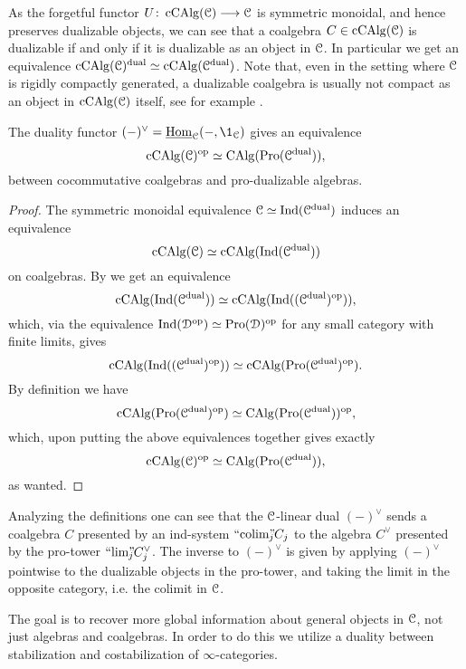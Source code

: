 \begin{remark}
    \label{rm:dualizable-iff-underlying}
    As the forgetful functor $U\colon\operatorname{cCAlg}(\EuScript{C})\longrightarrow\EuScript{C}$ is symmetric monoidal, and hence preserves dualizable objects, we can see that a coalgebra $C\in \operatorname{cCAlg}(\EuScript{C})$ is dualizable if and only if it is dualizable as an object in $\EuScript{C}$. In particular we get an equivalence $\operatorname{cCAlg}(\EuScript{C})^{\mathrm{dual}}\simeq \operatorname{cCAlg}(\EuScript{C}^{\mathrm{dual}})$. Note that, even in the setting where $\EuScript{C}$ is rigidly compactly generated, a dualizable coalgebra is usually not compact as an object in $\operatorname{cCAlg}(\EuScript{C})$ itself, see for example \cite[1.2.15]{lurie_2018_ELL2}. 
\end{remark}

\begin{lemma}
    \label{ch2:lm:sweedler-duality}
    The duality functor $(-)^\vee = \iHom_\C(-,\1_\C)$ gives an equivalence 
    \[\operatorname{cCAlg}(\EuScript{C})^{\mathrm{op}}\simeq \operatorname{CAlg}(\operatorname{Pro}(\EuScript{C}^{\mathrm{dual}})),\]
    between cocommutative coalgebras and pro-dualizable algebras.
\end{lemma}
\begin{proof}
    The symmetric monoidal equivalence $\EuScript{C}\simeq \operatorname{Ind}(\EuScript{C}^{\mathrm{dual}})$ induces an equivalence 
    \[\operatorname{cCAlg}(\EuScript{C}) \simeq \operatorname{cCAlg}(\operatorname{Ind}(\EuScript{C}^{\mathrm{dual}}))\]
    on coalgebras. By \cite[3.2.4]{lurie_2018_ELL1} we get an equivalence 
    \[\operatorname{cCAlg}(\operatorname{Ind}(\EuScript{C}^{\mathrm{dual}}))\simeq \operatorname{cCAlg}(\operatorname{Ind}((\EuScript{C}^{\mathrm{dual}})^{\mathrm{op}})),\]
    which, via the equivalence $\operatorname{Ind}(\EuScript{D}^{\mathrm{op}})\simeq \operatorname{Pro}(\EuScript{D})^{\mathrm{op}}$ for any small category with finite limits, gives 
    \[\operatorname{cCAlg}(\operatorname{Ind}((\EuScript{C}^{\mathrm{dual}})^{\mathrm{op}}))\simeq \operatorname{cCAlg}(\operatorname{Pro}(\EuScript{C}^{\mathrm{dual}})^{\mathrm{op}}).\]
    By definition we have 
    \[\operatorname{cCAlg}(\operatorname{Pro}(\EuScript{C}^{\mathrm{dual}})^{\mathrm{op}})\simeq \operatorname{CAlg}(\operatorname{Pro}(\EuScript{C}^{\mathrm{dual}}))^{\mathrm{op}},\]
    which, upon putting the above equivalences together gives exactly 
    \[\operatorname{cCAlg}(\EuScript{C})^{\mathrm{op}}\simeq \operatorname{CAlg}(\operatorname{Pro}(\EuScript{C}^{\mathrm{dual}})),\]
    as wanted. 
\end{proof}

\begin{remark}
    \label{ch2:rm:coalebra-in-Ind}
    Analyzing the definitions one can see that the $\EuScript{C}$-linear dual $(-)^\vee$ sends a coalgebra $C$ presented by an ind-system $``\!\operatorname{colim}\!"_{\hspace{-5pt} j} C_j$ to the algebra $C^\vee$ presented by the pro-tower $``\!\lim\!"_{\hspace{-5pt} j} C_j^\vee$. The inverse to $(-)^\vee$ is given by applying $(-)^\vee$ pointwise to the dualizable objects in the pro-tower, and taking the limit in the opposite category, i.e. the colimit in $\EuScript{C}$. 
\end{remark}

The goal is to recover more global information about general objects in $\EuScript{C}$, not just algebras and coalgebras. In order to do this we utilize a duality between stabilization and costabilization of $\infty$-categories. 

